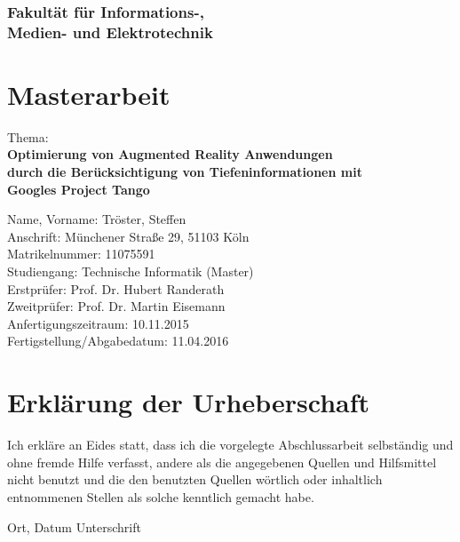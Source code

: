 \thispagestyle{empty}
\subsubsection*{Fakultät für Informations-, \\Medien- und Elektrotechnik}

\vspace{0.4cm}

\section*{Masterarbeit}

\vspace{0.6cm}
   
Thema: \\ 
\textbf{Optimierung von Augmented Reality Anwendungen \\
durch die Berücksichtigung von Tiefeninformationen mit \\
Googles Project Tango} \\ 

\vspace{.5cm}

\noindent Name, Vorname: Tröster, Steffen \\
Anschrift: Münchener Straße 29, 51103 Köln \\
Matrikelnummer: 11075591 \\
Studiengang: Technische Informatik (Master) \\

\noindent Erstprüfer:	Prof. Dr. Hubert Randerath \\
Zweitprüfer: Prof. Dr. Martin Eisemann \\

\noindent Anfertigungszeitraum: 10.11.2015 \\
Fertigstellung/Abgabedatum: 11.04.2016 \\



\section*{Erklärung der Urheberschaft}

Ich erkläre an Eides statt, dass ich die vorgelegte Abschlussarbeit 
selbständig und ohne fremde Hilfe verfasst, andere als die angegebenen 
Quellen und Hilfsmittel nicht benutzt und die den benutzten Quellen 
wörtlich oder inhaltlich entnommenen Stellen als solche kenntlich 
gemacht habe.


\vspace{2cm}
\hspace{2cm} Ort, Datum \hfill Unterschrift \hspace{2cm}